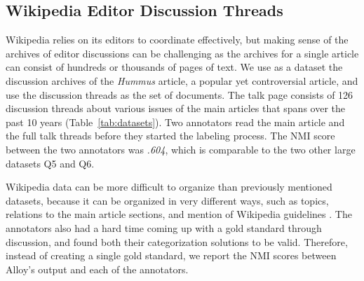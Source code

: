 \subsection{Wikipedia Editor Discussion Threads}

Wikipedia relies on its editors to coordinate effectively, but making sense of the archives of editor discussions can be challenging as the archives for a single article can consist of hundreds or thousands of pages of text. We use as a dataset the discussion archives of the \emph{Hummus} article, a 
popular yet controversial article, and use the discussion threads as the set of documents. The talk page consists of 126 discussion
threads about various issues of the main articles that spans over the past 10 years (Table~\ref{tab:datasets}).
Two annotators read the main article and the full talk threads
before they started the labeling process. The NMI score between the two
annotators was \emph{.604}, which is comparable to the two other large
datasets Q5 and Q6. 

Wikipedia data can be more difficult to organize than previously
mentioned datasets, because it can be organized in very different ways, such as
topics, relations to the main article sections, and mention of Wikipedia guidelines \cite{andre2014crowd}.
The annotators also had a hard time coming up with a gold standard through
discussion, and found both their categorization solutions to be valid. Therefore,
instead of creating a single gold standard, we report the NMI scores between
Alloy's output and each of the annotators.


